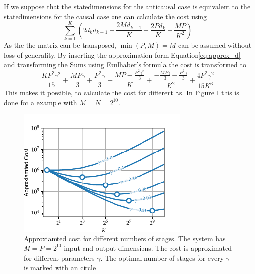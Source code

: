 \documentclass[doctype=mastersthesis,BCOR=15mm,biblatex]{ldvbook}%
\begin{document}
If we suppose that the statedimensions for the anticausal case is equivalent to the statedimensions for the causal case one can calculate the cost using
\begin{equation}
\sum_{k=1}^{K} \left(2 d_{k} d_{k+1} + \frac{2 M d_{k+1}}{K} + \frac{2 P d_{k}}{K} + \frac{M P}{K^{2}}\right)
\end{equation}
As the the matrix can be transposed, $\min(P,M)=M$ can be assumed without loss of generality.
By inserting the approximation form Equation\ref{eq:approx_d} and transforming the Sums using Faulhaber's formula \cite{knuth_johann_1993} the cost is transformed to
\begin{equation}\label{eq:cost_of_K}
 \frac{K P^{2} \gamma^{2}}{15} + \frac{M P \gamma}{3} + \frac{P^{2} \gamma}{3} + \frac{M P - \frac{P^{2} \gamma^{2}}{3}}{K} + \frac{- \frac{M P \gamma}{3} - \frac{P^{2} \gamma}{3}}{K^{2}} + \frac{4 P^{2} \gamma^{2}}{15 K^{3}}
\end{equation}
This makes it possible, to calculate the cost for different $\gamma$s.
In Figure\,\ref{fig:cost_parameters} 
this is done for a example with $M=N = 2^{10}$.
\begin{figure}[htb]
	\centering
	\includegraphics[width=0.75\textwidth]{Plots/cost_parameters.pdf}
	\caption{Approxiamted cost for different numbers of stages. The system has $M=P=2^{10}$ input and output dimensions. 
	The cost is approximated for different parameters $\gamma$.
	The optimal number of stages for every $\gamma$ is marked with an circle}
	\label{fig:cost_parameters}
\end{figure}
\end{document}
